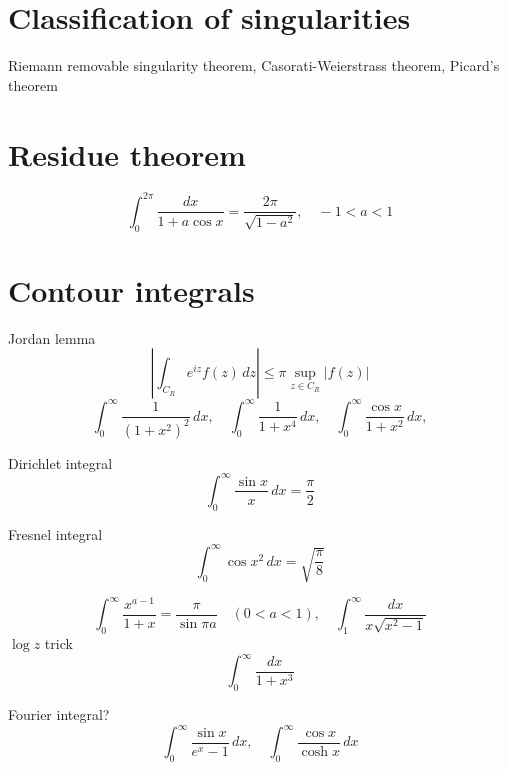 \documentclass{../note}
\begin{document}
\section{Classification of singularities}
Riemann removable singularity theorem,
Casorati-Weierstrass theorem,
Picard's theorem


\section{Residue theorem}
\begin{prb}

\end{prb}


\begin{prb}
\[\int_0^{2\pi}\frac{dx}{1+a\cos x}=\frac{2\pi}{\sqrt{1-a^2}},\quad-1<a<1\]
\end{prb}

\section{Contour integrals}


\begin{prb}
Jordan lemma
\[|\int_{C_R}e^{iz}f(z)\,dz|\le\pi\sup_{z\in C_R}|f(z)|\]
\[\int_0^\infty\frac1{(1+x^2)^2}\,dx,\quad\int_0^\infty\frac1{1+x^4}\,dx,\quad\int_0^\infty\frac{\cos x}{1+x^2}\,dx,\]
\end{prb}

\begin{prb}
Dirichlet integral
\[\int_0^\infty\frac{\sin x}x\,dx=\frac\pi2\]
\end{prb}

\begin{prb}
Fresnel integral
\[\int_0^\infty\cos x^2\,dx=\sqrt{\frac\pi8}\]
\end{prb}

\begin{prb}
\[\int_0^\infty\frac{x^{a-1}}{1+x}=\frac\pi{\sin\pi a}\quad(0<a<1),\quad\int_1^\infty\frac{dx}{x\sqrt{x^2-1}}\]
$\log z$ trick
\[\int_0^\infty\frac{dx}{1+x^3}\]
\end{prb}

\begin{prb}
Fourier integral?
\[\int_0^\infty\frac{\sin x}{e^x-1}\,dx,\quad\int_0^\infty\frac{\cos x}{\cosh x}\,dx\]
\end{prb}
\end{document}
